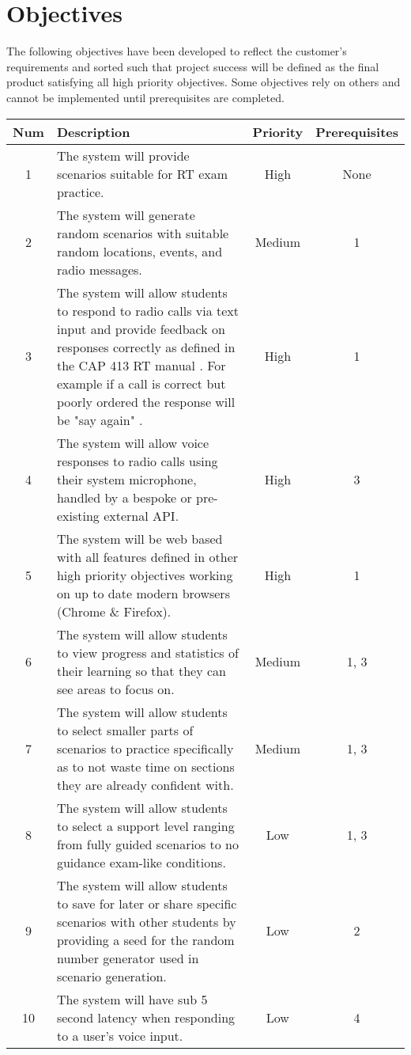\section{Objectives}
The following objectives have been developed to reflect the customer's requirements and sorted such that project success will be defined as the final product satisfying all high priority objectives. Some objectives rely on others and cannot be implemented until prerequisites are completed.

\begin{center}
    \begin{tabular}{ | c | m{22.7em} | c | c | }
        \hline
        \bf{Num} & \bf{Description} & \bf{Priority} & \bf{Prerequisites} \\
        \hline
        1 & The system will provide scenarios suitable for RT exam practice. & High & None \\
        \hline
        2 & The system will generate random scenarios with suitable random locations, events, and radio messages. & Medium & 1 \\
        \hline
        3 & The system will allow students to respond to radio calls via text input and provide feedback on responses correctly as defined in the CAP 413 RT manual \cite{CAP413}. For example if a call is correct but poorly ordered the response will be "say again" . & High & 1 \\
        \hline
        4 & The system will allow voice responses to radio calls using their system microphone, handled by a bespoke or pre-existing external API. & High & 3 \\
        \hline
        5 & The system will be web based with all features defined in other high priority objectives working on up to date modern browsers (Chrome \& Firefox). & High & 1 \\
        \hline
        6 & The system will allow students to view progress and statistics of their learning so that they can see areas to focus on. & Medium & 1, 3 \\
        \hline
        7 & The system will allow students to select smaller parts of scenarios to practice specifically as to not waste time on sections they are already confident with. & Medium & 1, 3 \\
        \hline
        8 & The system will allow students to select a support level ranging from fully guided scenarios to no guidance exam-like conditions. & Low & 1, 3 \\
        \hline
        9 & The system will allow students to save for later or share specific scenarios with other students by providing a seed for the random number generator used in scenario generation. & Low & 2 \\
        \hline
        10 & The system will have sub 5 second latency when responding to a user's voice input. & Low & 4 \\
        \hline
    \end{tabular}
\end{center}